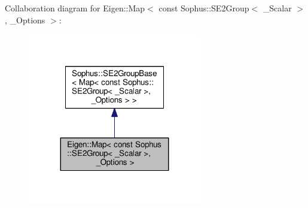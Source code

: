 Collaboration diagram for Eigen\+:\+:Map$<$ const Sophus\+:\+:S\+E2\+Group$<$ \+\_\+\+Scalar $>$, \+\_\+\+Options $>$\+:
\nopagebreak
\begin{figure}[H]
\begin{center}
\leavevmode
\includegraphics[width=215pt]{class_eigen_1_1_map_3_01const_01_sophus_1_1_s_e2_group_3_01___scalar_01_4_00_01___options_01_4__coll__graph}
\end{center}
\end{figure}
